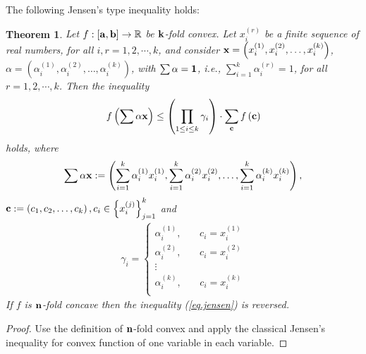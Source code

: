 \documentclass{amsart}
\newtheorem{theorem}{Theorem}
\theoremstyle{plain}
\numberwithin{equation}{section}
\begin{document}
The following Jensen's type inequality holds:
\begin{theorem}
\label{thm1}Let $f:\left[ {{\bf{a}},{\bf{b}}} \right] \to
\mathbb{R}$ be ${\bf{k}}$-fold convex. Let $x_i^{\left( r
\right)}$ be a finite sequence of real numbers, for all
$i,r=1,2,\cdots, k$, and consider $ {\bf{x}} = \left( {x_i^{\left(
1 \right)} ,x_i^{\left( 2 \right)} , \ldots ,x_i^{\left( k
\right)} } \right)$, $\alpha  = \left( {\alpha _i^{\left( 1
\right)} ,\alpha _i^{\left( 2 \right)} , \ldots ,\alpha _i^{\left(
k \right)} } \right)$, with $\sum \alpha   = {\bf{1}}$, i.e., $
\sum\limits_{i = 1}^k {\alpha _i^{\left( r \right)} }  = 1$, for
all $r=1,2,\cdots,k$.
 Then the inequality
\begin{align}
\label{eq.jensen}f\left( {\sum {\alpha {\bf{x}}} } \right)
\le\left( {\prod\limits_{1 \le i \le k} {\gamma _i } } \right)
\cdot \sum\limits_{\bf{c}} { f\left( {\bf{c}} \right)}
\end{align}
holds,  where
\begin{align*}
\sum {\alpha {\bf{x}}} : = \left( {\sum\limits_{i = 1}^{k} {\alpha
_i^{\left( 1 \right)} x_i^{\left( 1 \right)} } ,\sum\limits_{i =
1}^{k} {\alpha _i^{\left( 2 \right)} x_i^{\left( 2 \right)} } ,
\ldots ,\sum\limits_{i = 1}^{k} {\alpha _i^{\left( k \right)}
x_i^{\left( k \right)} } } \right),
\end{align*}
${\bf{c}}: = \left( {c_1 ,c_2, \ldots ,c_k } \right),c_i  \in
\left\{ {x_i^{\left( j \right)} } \right\}_{j = 1}^k$ and
\begin{align*}
\gamma _i  = \left\{ \begin{array}{l}
 \alpha _i^{\left( 1 \right)} ,\,\,\,\,\,\,\,\,\,\,\,c_i  = x_i^{\left( 1 \right)}  \\
 \alpha _i^{\left( 2 \right)} ,\,\,\,\,\,\,\,\,\,\,\,c_i  = x_i^{\left( 2 \right)}  \\
  \vdots  \\
 \alpha _i^{\left( k \right)} ,\,\,\,\,\,\,\,\,\,\,\,c_i  = x_i^{\left( k \right)}  \\
 \end{array} \right.
\end{align*}
If $f$ is ${\bf{n}}$-fold concave then the inequality
(\ref{eq.jensen}) is reversed.
\end{theorem}

\begin{proof}
Use the definition of ${\bf{n}}$-fold convex and apply the
classical Jensen's inequality for convex function of one variable
in each variable.
\end{proof}
\end{document}
